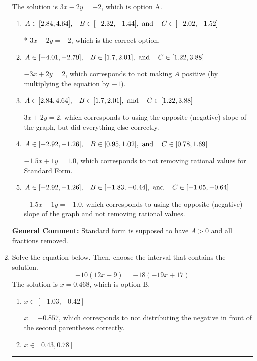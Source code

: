 \documentclass{extbook}[14pt]
\newcommand{\litem}[1]{\item #1

\rule{\textwidth}{0.4pt}}
\begin{document}
\begin{enumerate}
{The solution is \( 3x - 2y = -2 \), which is option A.\begin{enumerate}[label=\Alph*.]
\item \( A \in [2.84, 4.64], \hspace{3mm} B \in [-2.32, -1.44], \text{ and } \hspace{3mm} C \in [-2.02, -1.52] \)

* $3x - 2y = -2$, which is the correct option.
\item \( A \in [-4.01, -2.79], \hspace{3mm} B \in [1.7, 2.01], \text{ and } \hspace{3mm} C \in [1.22, 3.88] \)

 $-3x + 2y = 2$, which corresponds to not making $A$ positive (by multiplying the equation by $-1$).
\item \( A \in [2.84, 4.64], \hspace{3mm} B \in [1.7, 2.01], \text{ and } \hspace{3mm} C \in [1.22, 3.88] \)

 $3x + 2y = 2$, which corresponds to using the opposite (negative) slope of the graph, but did everything else correctly.
\item \( A \in [-2.92, -1.26], \hspace{3mm} B \in [0.95, 1.02], \text{ and } \hspace{3mm} C \in [0.78, 1.69] \)

 $-1.5x + 1y = 1.0$, which corresponds to not removing rational values for Standard Form.
\item \( A \in [-2.92, -1.26], \hspace{3mm} B \in [-1.83, -0.44], \text{ and } \hspace{3mm} C \in [-1.05, -0.64] \)

 $-1.5x - 1y = -1.0$, which corresponds to using the opposite (negative) slope of the graph and not removing rational values.
\end{enumerate}

\textbf{General Comment:} Standard form is supposed to have $A > 0$ and all fractions removed.
}
\litem{
Solve the equation below. Then, choose the interval that contains the solution.
\[ -10(12x + 9) = -18(-19x + 17) \]The solution is \( x = 0.468 \), which is option B.\begin{enumerate}[label=\Alph*.]
\item \( x \in [-1.03, -0.42] \)

$x = -0.857$, which corresponds to not distributing the negative in front of the second parentheses correctly.
\item \( x \in [0.43, 0.78] \)


\end{enumerate}}
\end{enumerate}
\end{document}
